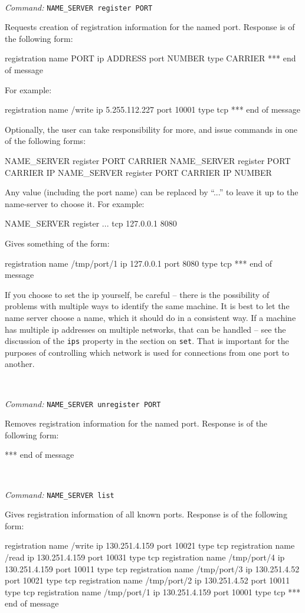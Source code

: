 \documentclass[a4]{article}
\newenvironment{packed_itemize}{
\begin{itemize}
  \renewcommand{\labelitemi}{$\triangleright$}
  \setlength{\itemsep}{1pt}
  \setlength{\parskip}{0pt}
  \setlength{\parsep}{0pt}
}{\end{itemize}}
\newcommand{\newusage}{\ \\\noindent\makebox[\textwidth]{\hrulefill}}
\newcommand{\usage}[1]{ \begin{packed_itemize} \item {\it Command:} {\tt #1} \end{packed_itemize}}
\begin{document}
\newusage{}
\usage{NAME\_SERVER register PORT}

Requests creation of registration information for the named port.  
Response is of the following form:
\begin{code}
registration name PORT ip ADDRESS port NUMBER type CARRIER
*** end of message
\end{code}
For example:
\begin{code}
registration name /write ip 5.255.112.227 port 10001 type tcp
*** end of message
\end{code}
%
Optionally, the user can take responsibility for more, and 
issue commands in one of the following forms:
\begin{code}
NAME_SERVER register PORT CARRIER
NAME_SERVER register PORT CARRIER IP
NAME_SERVER register PORT CARRIER IP NUMBER
\end{code}
Any value (including the port name) can be replaced by ``...'' to leave it 
up to the name-server to choose it.  For example:
\begin{code}
NAME_SERVER register ... tcp 127.0.0.1 8080
\end{code}
Gives something of the form:
\begin{code}
registration name /tmp/port/1 ip 127.0.0.1 port 8080 type tcp
*** end of message
\end{code}
If you choose to set the ip yourself, be careful -- there is the 
possibility of problems with multiple ways to identify the same
machine.  It is best to let the name server choose a name,
which it should do in a consistent way.  If a machine has
multiple ip addresses on multiple networks, that can be 
handled -- see the 
discussion of the {\tt ips} property in the section on {\tt set}.
That is important for the purposes of controlling which 
network is used for connections from one port to another.




\newusage{}
\usage{NAME\_SERVER unregister PORT}

Removes registration information for the named port.  
Response is of the following form:
\begin{code}
*** end of message
\end{code}


\newusage{}
\usage{NAME\_SERVER list}

Gives registration information of all known ports.
Response is of the following form:
\begin{code}
registration name /write ip 130.251.4.159 port 10021 type tcp
registration name /read ip 130.251.4.159 port 10031 type tcp
registration name /tmp/port/4 ip 130.251.4.159 port 10011 type tcp
registration name /tmp/port/3 ip 130.251.4.52 port 10021 type tcp
registration name /tmp/port/2 ip 130.251.4.52 port 10011 type tcp
registration name /tmp/port/1 ip 130.251.4.159 port 10001 type tcp
*** end of message
\end{code}
\end{document}
